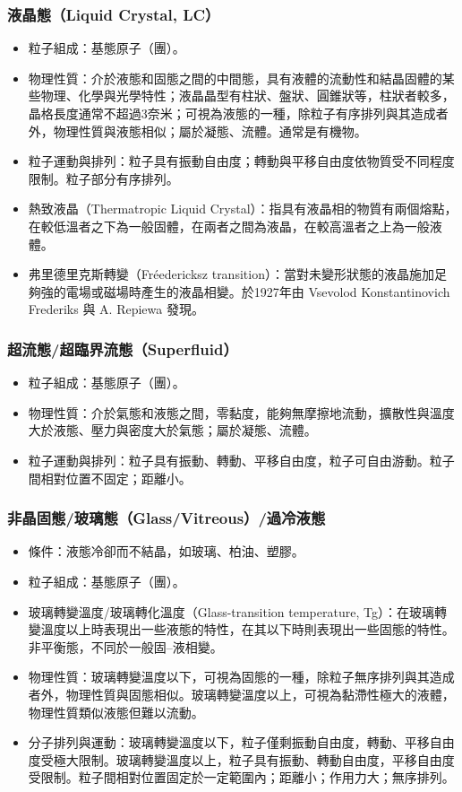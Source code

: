 \documentclass[a4paper,12pt]{report}
\begin{document}
\subsubsection{液晶態（Liquid Crystal, LC）}
\begin{itemize}
\item 粒子組成：基態原子（團）。
\item 物理性質：介於液態和固態之間的中間態，具有液體的流動性和結晶固體的某些物理、化學與光學特性；液晶晶型有柱狀、盤狀、圓錐狀等，柱狀者較多，晶格長度通常不超過3奈米；可視為液態的一種，除粒子有序排列與其造成者外，物理性質與液態相似；屬於凝態、流體。通常是有機物。
\item 粒子運動與排列：粒子具有振動自由度；轉動與平移自由度依物質受不同程度限制。粒子部分有序排列。
\item 熱致液晶（Thermatropic Liquid Crystal）：指具有液晶相的物質有兩個熔點，在較低溫者之下為一般固體，在兩者之間為液晶，在較高溫者之上為一般液體。
\item 弗里德里克斯轉變（Fréedericksz transition）：當對未變形狀態的液晶施加足夠強的電場或磁場時產生的液晶相變。於1927年由 Vsevolod Konstantinovich Frederiks 與 A. Repiewa 發現。
\end{itemize}
\subsubsection{超流態/超臨界流態（Superfluid）}
\begin{itemize}
\item 粒子組成：基態原子（團）。
\item 物理性質：介於氣態和液態之間，零黏度，能夠無摩擦地流動，擴散性與溫度大於液態、壓力與密度大於氣態；屬於凝態、流體。
\item 粒子運動與排列：粒子具有振動、轉動、平移自由度，粒子可自由游動。粒子間相對位置不固定；距離小。
\end{itemize}
\subsubsection{非晶固態/玻璃態（Glass/Vitreous）/過冷液態}
\begin{itemize}
\item 條件：液態冷卻而不結晶，如玻璃、柏油、塑膠。
\item 粒子組成：基態原子（團）。
\item 玻璃轉變溫度/玻璃轉化溫度（Glass-transition temperature, Tg）：在玻璃轉變溫度以上時表現出一些液態的特性，在其以下時則表現出一些固態的特性。非平衡態，不同於一般固–液相變。
\item 物理性質：玻璃轉變溫度以下，可視為固態的一種，除粒子無序排列與其造成者外，物理性質與固態相似。玻璃轉變溫度以上，可視為黏滯性極大的液體，物理性質類似液態但難以流動。
\item 分子排列與運動：玻璃轉變溫度以下，粒子僅剩振動自由度，轉動、平移自由度受極大限制。玻璃轉變溫度以上，粒子具有振動、轉動自由度，平移自由度受限制。粒子間相對位置固定於一定範圍內；距離小；作用力大；無序排列。
\end{itemize}
\end{document}
